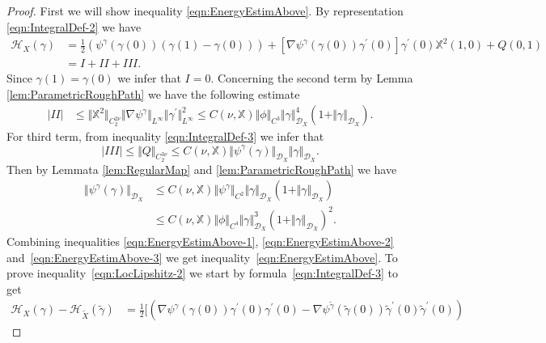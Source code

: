 \documentclass[11pt,a4paper,reqno]{amsart}%
\theoremstyle{plain}
\theoremstyle{remark}
\theoremstyle{plain}
\numberwithin{equation}{section}
\begin{document}
\begin{proof}%
First we will show inequality \eqref{eqn:EnergyEstimAbove}. By
representation \eqref{eqn:IntegralDef-2} we have
\begin{align}
\mathcal{H}_X(\gamma)&=\frac{1}{2}(\psi^{\gamma}(\gamma(0))(\gamma(1)-\gamma(0)))%
+\left[\nabla\psi^{\gamma}(\gamma(0))\gamma^\prime(0)\right]\gamma^\prime(0)\mathbb{X}^2(1,0)+Q(0,1)\nonumber\\
&=I+II+III . %
\end{align}
Since $\gamma(1)=\gamma(0)$ we infer that $I=0$.
Concerning the second term by Lemma \ref{lem:ParametricRoughPath}
we have the following estimate
\begin{align}
\vert II\vert &\leq
\Vert \mathbb{X}^2\Vert_{C_2^{2\nu}}\Vert \nabla\psi^\gamma\Vert_{L^{\infty}}\Vert \gamma^\prime\Vert_{L^{\infty}}^2
\leq
C(\nu,\mathbb{X})\Vert \phi\Vert_{C^3}\Vert \gamma\Vert_{\mathcal{D}_X}^4(1+\Vert \gamma\Vert_{\mathcal{D}_X}).\label{eqn:EnergyEstimAbove-1}
\end{align}
For third term,  from inequality \eqref{eqn:IntegralDef-3}  we infer that 
\begin{equation}
\vert III\vert \leq \Vert Q\Vert_{C_2^{3\nu}}\leq
C(\nu,\mathbb{X})\Vert \psi^\gamma(\gamma)\Vert_{\mathcal{D}_X}\Vert \gamma\Vert_{\mathcal{D}_X}.\label{eqn:EnergyEstimAbove-2}
\end{equation}
Then by Lemmata \ref{lem:RegularMap} and
\ref{lem:ParametricRoughPath} we have
\begin{align}
\Vert \psi^{\gamma}(\gamma)\Vert_{\mathcal{D}_X}&\leq
C(\nu,\mathbb{X})\Vert \psi^{\gamma}\Vert_{C^2}\Vert \gamma\Vert_{\mathcal{D}_X}(1+\Vert \gamma\Vert_{\mathcal{D}_X})\nonumber\\
&\leq C(\nu,\mathbb{X})\Vert \phi\Vert_{C^4}\Vert \gamma\Vert_{\mathcal{D}_X}^3(1+\Vert \gamma\Vert_{\mathcal{D}_X})^2 . \label{eqn:EnergyEstimAbove-3}
\end{align}
Combining inequalities \eqref{eqn:EnergyEstimAbove-1},
\eqref{eqn:EnergyEstimAbove-2} and~\eqref{eqn:EnergyEstimAbove-3}
we get inequality~\eqref{eqn:EnergyEstimAbove}.
%
To prove  inequality~\eqref{eqn:LocLipshitz-2} we start by formula~\eqref{eqn:IntegralDef-3} to get
\begin{align}\label{eqn:EnergyLocLip-1}
\mathcal{H}_X(\gamma)-\mathcal{H}_{\tilde{X}}(\tilde{\gamma})&=\frac{1}{2}
\Big[(\nabla\psi^{\gamma}(\gamma(0))\gamma^\prime(0)\gamma^\prime(0)-\nabla\psi^{\tilde{\gamma}}(\tilde{\gamma}(0))\tilde{\gamma}^\prime(0)\tilde{\gamma}^\prime(0))

\end{align}
\end{proof}
\end{document}
